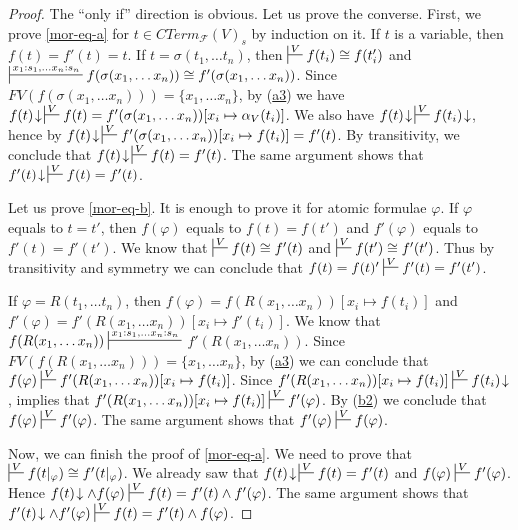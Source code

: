 \documentclass[reqno]{amsart}
\newcommand{\axref}[1]{(\hyperref[ax:#1]{#1})}
\theoremstyle{definition}
\theoremstyle{remark}
\numberwithin{figure}{section}
\begin{document}
\begin{proof}
The ``only if'' direction is obvious.
Let us prove the converse.
First, we prove \eqref{mor-eq-a} for $t \in CTerm_\mathcal{F}(V)_s$ by induction on it.
If $t$ is a variable, then $f(t) = f'(t) = t$.
If $t = \sigma(t_1, \ldots t_n)$, then $\sststile{}{V} f(t_i) \cong f(t'_i)$
and $\sststile{}{x_1 : s_1, \ldots x_n : s_n} f(\sigma(x_1, \ldots x_n)) \cong f'(\sigma(x_1, \ldots x_n))$.
Since $FV(f(\sigma(x_1, \ldots x_n))) = \{ x_1, \ldots x_n\}$, by \axref{a3} we have
$f(t)\!\downarrow\,\sststile{}{V} f(t) = f'(\sigma(x_1, \ldots x_n))[x_i \mapsto \alpha_V(t_i)]$.
We also have $f(t)\!\downarrow\,\sststile{}{V} f(t_i)\!\downarrow$, hence by 
$f(t)\!\downarrow\,\sststile{}{V} f'(\sigma(x_1, \ldots x_n))[x_i \mapsto f(t_i)] = f'(t)$.
By transitivity, we conclude that $f(t)\!\downarrow\,\sststile{}{V} f(t) = f'(t)$.
The same argument shows that $f'(t)\!\downarrow\,\sststile{}{V} f(t) = f'(t)$.

Let us prove \eqref{mor-eq-b}.
It is enough to prove it for atomic formulae $\varphi$.
If $\varphi$ equals to $t = t'$, then $f(\varphi)$ equals to $f(t) = f(t')$ and $f'(\varphi)$ equals to $f'(t) = f'(t')$.
We know that $\sststile{}{V} f(t) \cong f'(t)$ and $\sststile{}{V} f(t') \cong f'(t')$.
Thus by transitivity and symmetry we can conclude that $f(t) = f(t)' \sststile{}{V} f'(t) = f'(t')$.

If $\varphi = R(t_1, \ldots t_n)$, then $f(\varphi) = f(R(x_1, \ldots x_n))[x_i \mapsto f(t_i)]$
and $f'(\varphi) = f'(R(x_1, \ldots x_n))[x_i \mapsto f'(t_i)]$.
We know that $f(R(x_1, \ldots x_n)) \sststile{}{x_1 : s_1, \ldots x_n : s_n}$ \linebreak $f'(R(x_1, \ldots x_n))$.
Since $FV(f(R(x_1, \ldots x_n))) = \{ x_1, \ldots x_n \}$, by \axref{a3} we can conclude that $f(\varphi) \sststile{}{V} f'(R(x_1, \ldots x_n))[x_i \mapsto f(t_i)]$.
Since $f'(R(x_1, \ldots x_n))[x_i \mapsto f(t_i)] \sststile{}{V} f(t_i)\!\downarrow$,  implies that
$f'(R(x_1, \ldots x_n))[x_i \mapsto f(t_i)] \sststile{}{V} f'(\varphi)$.
By \axref{b2} we conclude that $f(\varphi) \sststile{}{V} f'(\varphi)$.
The same argument shows that $f'(\varphi) \sststile{}{V} f(\varphi)$.

Now, we can finish the proof of \eqref{mor-eq-a}.
We need to prove that $\sststile{}{V} f(t|_\varphi) \cong f'(t|_\varphi)$.
We already saw that $f(t)\!\downarrow\,\sststile{}{V} f(t) = f'(t)$ and $f(\varphi) \sststile{}{V} f'(\varphi)$.
Hence $f(t)\!\downarrow \land f(\varphi) \sststile{}{V} f(t) = f'(t) \land f'(\varphi)$.
The same argument shows that $f'(t)\!\downarrow \land f'(\varphi) \sststile{}{V} f(t) = f'(t) \land f(\varphi)$.
\end{proof}
\end{document}
